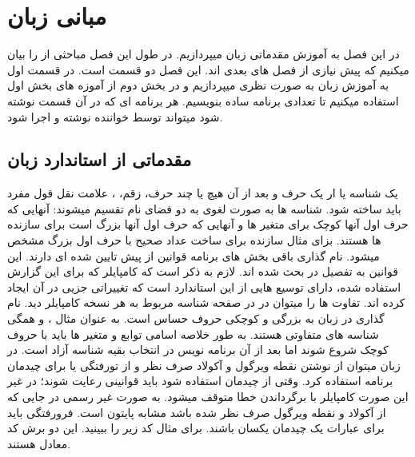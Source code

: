 \chapter{
مبانی زبان 
}
\label{chp:chap2}\thispagestyle{empty}
در این فصل به آموزش مقدماتی زبان 
میپردازیم. در طول این فصل مباحثی از 
را بیان میکنیم که پیش نیازی از فصل های بعدی اند. این فصل دو قسمت است. در قسمت اول به آموزش زبان به صورت نظری میپردازیم و در بخش دوم از آموزه های بخش اول استفاده میکنیم تا تعدادی برنامه ساده بنویسیم. هر برنامه ای که در آن قسمت نوشته شود میتواند توسط خواننده نوشته و اجرا شود. 
\section{
مقدماتی از استاندارد زبان
}
یک شناسه یا 
ار یک حرف و بعد از آن هیچ یا چند حرف، زقم، 
\eng{\_}
، علامت نقل قول مفرد 
\eng{\'}
باید ساخته شود. شناسه ها به صورت لغوی به دو فضای نام 
تقسیم میشوند: آنهایی که حرف اول آنها کوچک برای متغیر ها و آنهایی که حرف اول آنها بزرگ است برای سازنده ها
 هستند. بزای مثال سازنده 
برای ساخت عداد صحیح با حرف اول بزرگ مشخص میشود. نام گذاری باقی بخش های برنامه قوانین از پیش تایین شده ای دارند. این قوانین به تفصیل در
\href{https://www.haskell.org/onlinereport/haskell2010/}{}
بحث شده اند. لازم به ذکر است که کامپایلر
که برای این گزارش استفاده شده، دارای توسیع هایی از این استاندارد است که تغییراتی جزیی در آن ایجاد کرده اند. تفاوت ها را میتوان در 
\href{https://www.haskell.org/ghc/}{}
در صفحه شناسه مربوط به هر نسخه کامپایلر دید.
\newline
نام گذاری در زبان 
به بزرگی و کوچکی حروف حساس است. به عنوان مثال
، 
و
همگی شناسه های متفاوتی هستند. به طور خلاصه اسامی توابع و متغیر ها باید با حروف کوچک شروع شوند اما بعد از آن برنامه نویس در انتخاب بقیه شناسه آزاد است.
\newline
در زبان 
میتوان از نوشتن نقطه ویرگول 
\hs{;}
و آکولاد
\hs{{ }}
صرف نظر و از تورفتگی یا 
برای چیدمان برنامه استفاده کرد. وقتی از چیدمان استفاده شود باید قوانینی رعایت شوند؛ در غیر این صورت کامپایلر با برگرداندن خطا متوقف میشود. به صورت غیر رسمی در جایی که از آکولاد و نقطه ویرگول صرف نظر شده باشد مشابه پایتون است. فرورفتگی باید برای عبارات یک چیدمان یکسان باشند. برای مثال کد زیر را ببینید. این دو برش کد معادل هستند.
